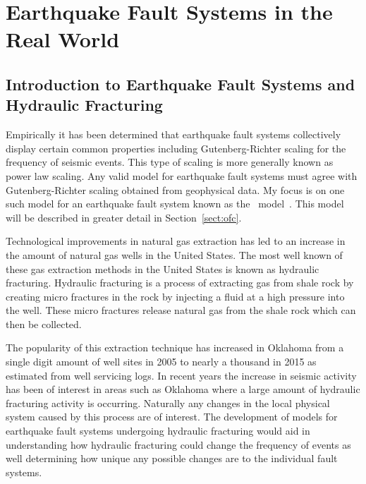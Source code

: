 

\pagebreak

\chapter{\label{chp:intro_quakes}Earthquake Fault Systems in the Real World}

\section{Introduction to Earthquake Fault Systems and Hydraulic Fracturing}

Empirically it has been determined that earthquake fault systems collectively display certain common properties including Gutenberg-Richter scaling for the frequency of seismic events. This type of scaling is more generally known as power law scaling. Any valid model for earthquake fault systems must agree with Gutenberg-Richter scaling obtained from geophysical data. My focus is  on one such model for an earthquake fault system known as the \ofc\ model~\cite{ofc92}. This model will be described in greater detail in Section~\ref{sect:ofc}.

Technological improvements in natural gas extraction has led to an increase in the amount of natural gas wells in the United States. The most well known of these gas extraction methods in the United States is known as hydraulic fracturing. Hydraulic fracturing is a process of extracting gas from shale rock by creating micro fractures in the rock by injecting a fluid at a high pressure into the well. These micro fractures release natural gas from the shale rock which can then be collected. 

The popularity of this extraction technique has increased in Oklahoma from a single digit amount of well sites in 2005 to nearly a thousand in 2015 as estimated from well servicing logs. In recent years the increase in  seismic activity has been of interest in areas such as Oklahoma where a large amount of hydraulic fracturing activity is occurring. Naturally any changes in the local physical system caused by this process are of interest. The development of models for earthquake fault systems undergoing hydraulic fracturing would aid in understanding how  hydraulic fracturing  could change the frequency of events as well determining how unique any possible changes are to the individual fault systems.

